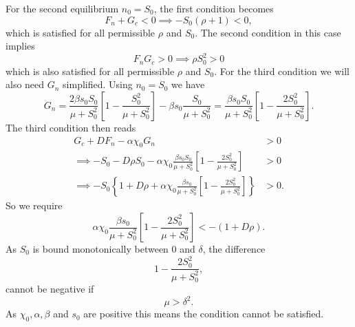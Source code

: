 \documentclass[a4paper, 12pt]{article}
\begin{document}
\begin{enumerate}[label={\bf \arabic{*}.\;}, ref={\arabic{*}},itemsep=3ex, left=0ex]
{\begin{enumerate}
{            For the second equilibrium $n_0=S_0$, the first condition becomes
            \begin{equation}
              F_n + G_c <0 \implies -S_0(\rho+1) <0,
            \end{equation}
            which is satisfied for all permissible $\rho$ and $S_0$. The second condition in this case implies
            \begin{equation}
              F_nG_c>0 \implies \rho S_0^2>0
            \end{equation}
            which is also satisfied for all permissible $\rho$ and $S_0$. For the third condition we will also need $G_n$ simplified. Using $n_0 =S_0$ we have
            \begin{equation}
              G_n = \frac{2\beta s_0S_0}{\mu + S_0^2}\left[1-\frac{S_0^2}{\mu +S_0^2}\right] - \beta s_0\frac{S_0}{\mu + S_0^2} =  \frac{\beta s_0S_0}{\mu + S_0^2}\left[1-\frac{2S_0^2}{\mu +S_0^2}\right].
            \end{equation}
            The third condition then reads
            \begin{align}
              G_c + D F_n - \alpha\chi_0 G_n & > 0 \\
              \implies - S_0 - D \rho S_0 -\alpha\chi_0\frac{\beta s_0S_0}{\mu + S_0^2}\left[1-\frac{2S_0^2}{\mu +S_0^2}\right] & > 0 \\
              \implies - S_0\left\{1+ D\rho + \alpha\chi_0\frac{\beta s_0}{\mu + S_0^2}\left[1-\frac{2S_0^2}{\mu +S_0^2}\right]\right\} & >0.
            \end{align}
            So we require
            \begin{equation}
              \alpha\chi_0\frac{\beta s_0}{\mu + S_0^2}\left[1-\frac{2S_0^2}{\mu +S_0^2}\right] < -(1+ D\rho).
            \end{equation}
            As $S_0$ is bound monotonically between $0$ and $\delta$, the difference
            \begin{equation}
              1-\frac{2S_0^2}{\mu +S_0^2},
            \end{equation}
            cannot be negative if
            \begin{equation}
              \mu >\delta^2.
            \end{equation}
            As $\chi_0, \alpha,\beta$ and $s_0$ are positive this means the condition cannot be satisfied.
          }
      \end{enumerate}

}
\end{enumerate}
\end{document}

